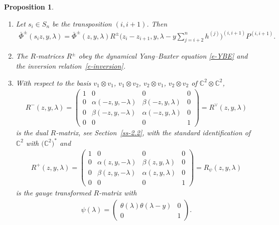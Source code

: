 \documentclass[10pt,a4paper]{amsart}
\numberwithin{equation}{section}
\newtheorem{Proposition}[Theorem]{Proposition}
 { \theoremstyle{definition}
\newtheorem{Definition}[Theorem]{Definition}
\newtheorem{Example}[Theorem]{Example}
\newtheorem{Remark}[Theorem]{Remark} }
\begin{document}
\begin{Proposition}\label{prop-3}\quad
\begin{enumerate}\itemsep=0pt
 \item[$(i)$] Let $s_i\in S_n$ be the transposition $(i,i+1)$. Then
 \begin{gather*}
 \bar\Phi^\pm(s_iz,y, \lambda) =\bar\Phi^\pm(z,y,\lambda) R^\pm\bigg(z_i-z_{i+1},y,\lambda -y\sum_{j=i+2}^nh^{(j)}\bigg)^{(i,i+1)}P^{(i,i+1)}.
 \end{gather*}
 \item[$(ii)$] The $R$-matrices $R^\pm$ obey the dynamical Yang--Baxter equation \eqref{e-YBE} and the inversion relation~\eqref{e-inversion}.
 \item[$(iii)$] With respect to the basis $v_1\otimes v_1$, $v_1\otimes v_2$, $v_2\otimes v_1$, $v_2\otimes v_2$ of $\mathbb C^2\otimes \mathbb C^2$,
 \begin{gather*}
 R^-(z,y,\lambda)= \left(
 \begin{matrix}
 1 & 0 & 0 & 0\\
 0 & \alpha(-z,y,-\lambda) & \beta(-z,y,\lambda) & 0\\
 0 & \beta(-z,y,-\lambda) & \alpha(-z,y,\lambda) & 0\\
 0 & 0 & 0& 1
 \end{matrix}
 \right)=R^\vee(z,y,\lambda)
 \end{gather*}
 is the dual $R$-matrix, see Section~{\rm \ref{ss-2.2}}, with the standard identification of $\mathbb C^2$ with $\big(\mathbb C^2\big)^*$ and
 \begin{gather*}
 R^+(z,y,\lambda)= \left(
 \begin{matrix}
 1 & 0 & 0 & 0\\
 0 & \alpha(z,y,-\lambda) & \beta(z,y,\lambda) & 0\\
 0 & \beta(z,y,-\lambda) & \alpha(z,y,\lambda) & 0\\
 0 & 0 & 0& 1
 \end{matrix}
 \right)= R_\psi(z,y,\lambda)
 \end{gather*}
 is the gauge transformed $R$-matrix with
 \begin{gather*}
 \psi(\lambda)=\left(
 \begin{matrix}
 \theta(\lambda)\theta(\lambda-y) & 0 \\
 0 & 1
 \end{matrix}
 \right).
 \end{gather*}
 \end{enumerate}
\end{Proposition}
\end{document}

